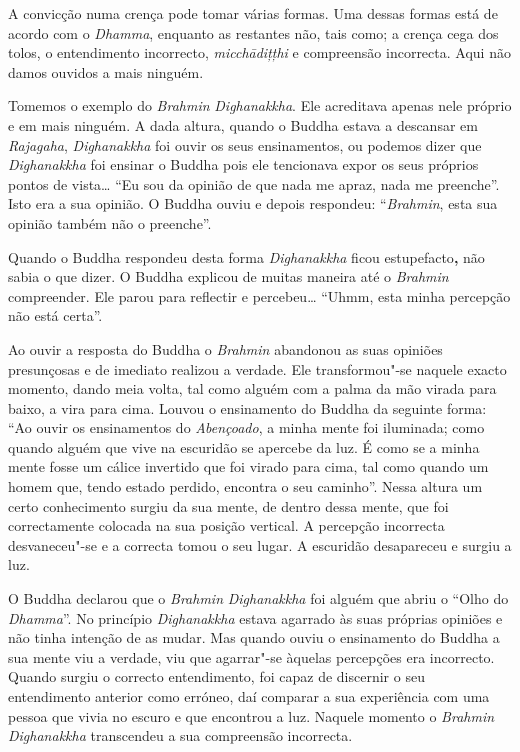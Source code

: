A convicção numa crença pode tomar várias formas. Uma dessas formas está
de acordo com o \emph{Dhamma}, enquanto as restantes não, tais como; a
crença cega dos tolos, o entendimento incorrecto, \emph{micchādițțhi} e
compreensão incorrecta. Aqui não damos ouvidos a mais ninguém.

Tomemos o exemplo do \emph{Brahmin} \emph{Dighanakkha}. Ele acreditava
apenas nele próprio e em mais ninguém. A dada altura, quando o Buddha
estava a descansar em \emph{Rajagaha}, \emph{Dighanakkha} foi ouvir os
seus ensinamentos, ou podemos dizer que \emph{Dighanakkha} foi ensinar o
Buddha pois ele tencionava expor os seus próprios pontos de
vista\ldots{} ``Eu sou da opinião de que nada me apraz, nada me
preenche''. Isto era a sua opinião. O Buddha ouviu e depois respondeu:
``\emph{Brahmin}, esta sua opinião também não o preenche''.

Quando o Buddha respondeu desta forma \emph{Dighanakkha} ficou
estupefacto\textbf{,} não sabia o que dizer. O Buddha explicou de muitas
maneira até o \emph{Brahmin} compreender. Ele parou para reflectir e
percebeu\ldots{} ``Uhmm, esta minha percepção não está certa''.

Ao ouvir a resposta do Buddha o \emph{Brahmin} abandonou as suas
opiniões presunçosas e de imediato realizou a verdade. Ele
transformou"-se naquele exacto momento, dando meia volta, tal como alguém
com a palma da mão virada para baixo, a vira para cima. Louvou o
ensinamento do Buddha da seguinte forma: ``Ao ouvir os ensinamentos do
\emph{Abençoado}, a minha mente foi iluminada; como quando alguém que
vive na escuridão se apercebe da luz. É como se a minha mente fosse um
cálice invertido que foi virado para cima, tal como quando um homem que,
tendo estado perdido, encontra o seu caminho''. Nessa altura um certo
conhecimento surgiu da sua mente, de dentro dessa mente, que foi
correctamente colocada na sua posição vertical. A percepção incorrecta
desvaneceu"-se e a correcta tomou o seu lugar. A escuridão desapareceu e
surgiu a luz.

O Buddha declarou que o \emph{Brahmin} \emph{Dighanakkha} foi alguém que
abriu o ``Olho do \emph{Dhamma}''. No princípio \emph{Dighanakkha}
estava agarrado às suas próprias opiniões e não tinha intenção de as
mudar. Mas quando ouviu o ensinamento do Buddha a sua mente viu a
verdade, viu que agarrar"-se àquelas percepções era incorrecto. Quando
surgiu o correcto entendimento, foi capaz de discernir o seu
entendimento anterior como erróneo, daí comparar a sua experiência com
uma pessoa que vivia no escuro e que encontrou a luz. Naquele momento o
\emph{Brahmin} \emph{Dighanakkha} transcendeu a sua compreensão
incorrecta.


